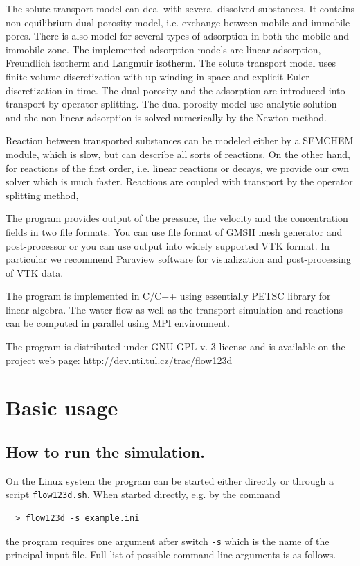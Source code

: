 \documentclass[12pt,a4paper]{report}
\begin{document}
The solute transport model can deal with several dissolved substances. It contains non-equilibrium dual porosity model, 
i.e. exchange between mobile and immobile 
pores. There is also model for several types of adsorption in both the mobile and immobile zone. The implemented adsorption models are
linear adsorption, Freundlich isotherm and Langmuir isotherm. The solute transport model uses finite volume discretization 
with up-winding in space and explicit Euler discretization in time. The dual porosity and the adsorption are introduced into transport by operator splitting.
The dual porosity model use analytic solution and the non-linear adsorption is solved numerically by the Newton method.

Reaction between transported substances can be modeled either by a SEMCHEM module, which is slow, but can describe all sorts of reactions. On the other hand,
for reactions of the first order, i.e. linear reactions or decays, we provide our own solver which is much faster. Reactions are coupled with transport 
by the operator splitting method,

The program provides output of the pressure, the velocity and the concentration fields in two file formats. You can use file format of GMSH mesh generator and post-processor 
or you can use output into widely supported VTK format. In particular we recommend Paraview software for visualization and post-processing of VTK data.

The program is implemented in C/C++ using essentially PETSC library for linear algebra. The water flow as well as the transport simulation and reactions can be computed 
in parallel using MPI environment. 

The program is distributed under GNU GPL v. 3 license and is available on the project web page:
http://dev.nti.tul.cz/trac/flow123d

\section{Basic usage}

\subsection{How to run the simulation.}
On the Linux system the program can be started either directly or through a script \verb'flow123d.sh'. When started directly, e.g. by the command
\begin{verbatim}
  > flow123d -s example.ini
\end{verbatim}
the program requires one argument after switch \verb'-s' which is the name of the principal input file. Full list of possible command line arguments is as follows.
\end{document}

